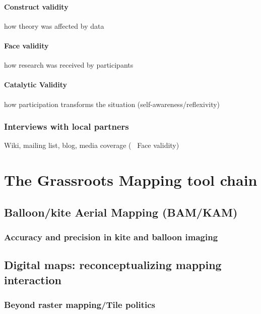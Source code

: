 \documentclass[11pt]{report}
\begin{document}
\subsubsection{Construct validity}
how theory was affected by data
\subsubsection{Face validity}
how research was received by participants
\subsubsection{Catalytic Validity}
how participation transforms the situation (self-awareness/reflexivity)

\subsection{Interviews with local partners}
Wiki, mailing list, blog, media coverage (~ Face validity)

\chapter{The Grassroots Mapping tool chain}
\section{Balloon/kite Aerial Mapping (BAM/KAM)}
\subsection{Accuracy and precision in kite and balloon imaging}

\section{Digital maps: reconceptualizing mapping interaction}
\subsection{Beyond raster mapping/Tile politics}
\end{document}

